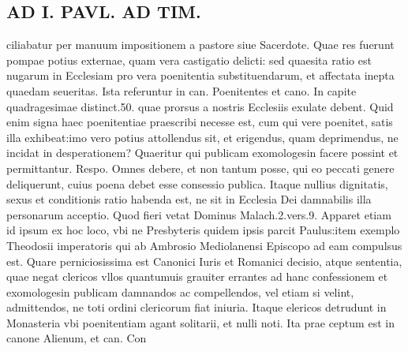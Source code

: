 \documentclass{article}
\begin{document}
\begin{pages}
\section*{AD I. PAVL. AD TIM. }
\marginpar{[ p.344 ]}\pstart ciliabatur per manuum impositionem a pastore siue Sacerdote. Quae res fuerunt pompae potius externae, quam vera castigatio delicti: sed quaesita ratio est nugarum in Ecclesiam pro vera poenitentia substituendarum, et affectata inepta quaedam seueritas. Ista referuntur in can. Poenitentes et cano. In capite quadragesimae distinct.50. quae prorsus a nostris Ecclesiis exulate debent. Quid enim signa haec poenitentiae praescribi necesse est, cum qui vere poenitet, satis illa exhibeat:imo vero potius attollendus sit, et erigendus, quam deprimendus, ne incidat in desperationem? Quaeritur qui publicam exomologesin facere possint et permittantur. Respo. Omnes debere, et non tantum posse, qui eo peccati genere deliquerunt, cuius poena debet esse consessio publica. Itaque nullius dignitatis, sexus et conditionis ratio habenda est, ne sit in Ecclesia Dei damnabilis illa personarum acceptio. Quod fieri vetat Dominus Malach.2.vers.9. Apparet etiam id ipsum ex hoc loco, vbi ne Presbyteris quidem ipsis parcit Paulus:item exemplo Theodosii imperatoris qui ab Ambrosio Mediolanensi Episcopo ad eam compulsus est. Quare perniciosissima est Canonici Iuris et Romanici decisio, atque sententia, quae negat clericos vllos quantumuis grauiter errantes ad hanc confessionem et exomologesin publicam damnandos ac compellendos, vel etiam si velint, admittendos, ne toti ordini clericorum fiat iniuria. Itaque elericos detrudunt in Monasteria vbi poenitentiam agant solitarii, et nulli noti. Ita prae ceptum est in canone Alienum, et can. Con\pend

\end{pages}
\end{document}
